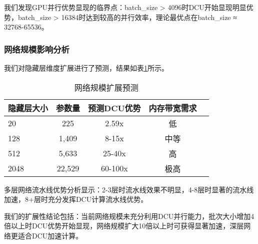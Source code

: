 \documentclass[12pt,a4paper]{article}
\begin{document}
我们发现GPU并行优势显现的临界点：batch\_size > 4096时DCU开始显现明显优势，batch\_size > 16384时达到较高的并行效率，理论最优点在batch\_size ≈ 32768-65536。

\subsubsection{网络规模影响分析}

我们对隐藏层维度扩展进行了预测，结果如表\ref{tab:network_scale_prediction}所示。

\begin{table}[H]
\centering
\caption{网络规模扩展预测}
\label{tab:network_scale_prediction}
\begin{tabular}{lcccc}
\toprule
隐藏层大小 & 参数量 & 预测DCU优势 & 内存带宽需求 \\
\midrule
20 & 225 & 2.59x & 低 \\
128 & 1,409 & 8-15x & 中等 \\
512 & 5,633 & 25-40x & 高 \\
2048 & 22,529 & 60-100x & 极高 \\
\bottomrule
\end{tabular}
\end{table}

多层网络流水线优势分析显示：2-3层时流水线效果不明显，4-8层时显著的流水线加速，8+层时充分发挥DCU计算流水线优势。

我们的扩展性结论包括：当前网络规模未充分利用DCU并行能力，批次大小增加4倍以上时DCU优势开始显现，网络规模扩大10倍以上时可获得显著加速，深层网络更适合DCU加速计算。
\end{document}
